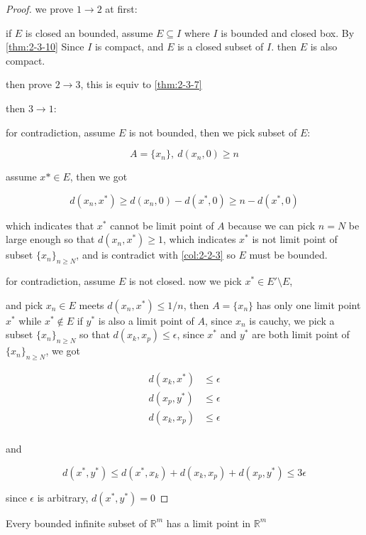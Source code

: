 \begin{proof}
    we prove $1 \to 2$ at first:
    
    if $E$ is closed an bounded, assume $E \subseteq I$ where $I$ is bounded and closed box. By \autoref{thm:2-3-10} Since $I$ is compact, and $E$ is a closed subset of $I$.
    then $E$ is also compact.

    then prove $2 \to 3$, this is equiv to \autoref{thm:2-3-7}

    then $3 \to 1$:

    for contradiction, assume $E$ is not bounded, then we pick subset of $E$:

    \[
        A = \{ x_n \},\: d(x_n, 0) \ge n
    \]

    assume $x* \in E$, then we got

    \[
        d(x_n, x^*) \ge d(x_n,0) - d(x^*,0) \ge n -d(x^*, 0)
    \]

    which indicates that $x^*$ cannot be limit point of $A$
    because we can pick $n = N$ be large enough so that $d(x_n, x^*) \ge 1$, 
    which indicates $x^*$ is not limit point of subset $\{ x_n\}_{n \ge N} $, and 
    is contradict with \autoref{col:2-2-3}
    so $E$ must be bounded.

    for contradiction, assume $E$ is not closed. now we pick $x^* \in E' \setminus E$,

    and pick $x_n \in E$ meets $d(x_n, x^*) \le 1/n$, then $A = \{ x_n \}$ has only one limit point $x^*$
    while $x^* \notin E$
    if $y^*$ is also a limit point of $A$, since $x_n$ is cauchy, we pick a
    subset $\{ x_n\}_{n \ge N}$ so that $d(x_k, x_p) \le \epsilon$, since $x^*$ and $y^*$ are both
    limit point of $\{ x_n\}_{n \ge N}$, we got

    \begin{align*}
        d(x_k, x^*) &\le \epsilon \\
        d(x_p, y^*) &\le \epsilon \\
        d(x_k, x_p) &\le \epsilon \\
    \end{align*}

    and

    \[
        d(x^*, y^*) \le d(x^*, x_k) + d(x_k, x_p) + d(x_p, y^*) \le 3\epsilon
    \]

    since $\epsilon$ is arbitrary, $d(x^*, y^*) = 0$

\end{proof}

\begin{thm}[Weierstrass]
   Every bounded infinite subset of $\mathbb{R}^m$ has a limit point in $\mathbb{R}^m$ 
\end{thm}

